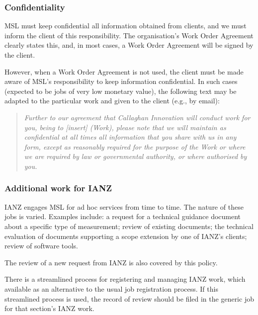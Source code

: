 \subsubsection{Confidentiality}
\label{sss:confidentiality}
MSL must keep confidential all information obtained from clients, and we must inform the client of this responsibility. The organisation’s Work Order Agreement clearly states this, and, in most cases, a Work Order Agreement will be signed by the client. 

However, when a Work Order Agreement is not used, the client must be made aware of MSL’s responsibility to keep information confidential. In such cases (expected to be jobs of very low monetary value), the following text may be adapted to the particular work and given to the client (e.g., by email):
\begin{quote}
\textit{Further to our agreement that Callaghan Innovation will conduct work for you, being to [insert] (Work), please note that we will maintain as confidential at all times all information that you share with us in any form, except as reasonably required for the purpose of the Work or where we are required by law or governmental authority, or where authorised by you.}
\end{quote}


\subsubsection{Additional work for IANZ}
IANZ engages MSL for ad hoc services from time to time. The nature of these jobs is varied. Examples include: a request for a technical guidance document about a specific type of measurement; review of existing documents; the technical evaluation of documents supporting a scope extension by one of IANZ’s clients; review of software tools. 

The review of a new request from IANZ is also covered by this policy.

There is a streamlined process for registering and managing IANZ work, which available as an alternative to the usual job registration process. If this streamlined process is used, the record of review should be filed in the generic job for that section’s IANZ work.